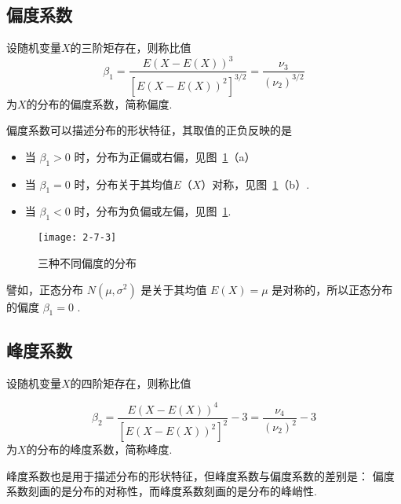 \subsection{偏度系数}

\begin{definition}
	设随机变量$ X $的三阶矩存在，则称比值
	\begin{equation}
	\beta_{1}=\frac{E(X-E(X))^{3}}{\left[E(X-E(X))^{2}\right]^{3 / 2}}=\frac{\nu_{3}}{\left(\nu_{2}\right)^{3 / 2}} \label{eq:2.7.9}
	\end{equation}
	为$ X $的分布的偏度系数，简称偏度.
	
\end{definition}

偏度系数可以描述分布的形状特征，其取值的正负反映的是

\begin{itemize}
	\item 当 $\beta_{1}>0$ 时，分布为正偏或右偏，见图~\ref{fig:2-7-3}（a）
	\item 当 $\beta_{1}=0$ 时，分布关于其均值$ E（X） $对称，见图~\ref{fig:2-7-3}（b）.
	\item 当 $\beta_{1}<0$ 时，分布为负偏或左偏，见图~\ref{fig:2-7-3}.
\end{itemize}

\begin{figure}
	\centering
	\texttt{[image: 2-7-3]}
	\caption{三种不同偏度的分布}
	\label{fig:2-7-3}
\end{figure}


譬如，正态分布 $N\left(\mu, \sigma^{2}\right)$ 是关于其均值 $E(X)=\mu$ 是对称的，所以正态分布的偏度 $\beta_{1}=0$ .

\subsection{峰度系数}

\begin{definition}
	设随机变量$ X $的四阶矩存在，则称比值
	
	\begin{equation}
	\beta_{2}=\frac{E(X-E(X))^{4}}{\left[E(X-E(X))^{2}\right]^{2}}-3=\frac{\nu_{4}}{\left(\nu_{2}\right)^{2}}-3 \label{eq:2.7.10}
	\end{equation}
	为$ X $的分布的峰度系数，简称峰度.
\end{definition}

峰度系数也是用于描述分布的形状特征，但峰度系数与偏度系数的差别是：
偏度系数刻画的是分布的对称性，而峰度系数刻画的是分布的峰峭性.

